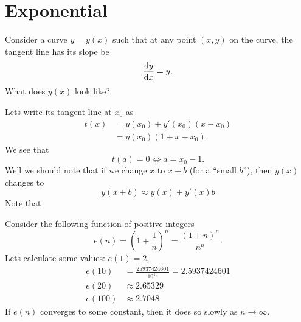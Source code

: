 \section{Exponential}
Consider a curve $y=y(x)$ such that at any point
$(x,y)$ on the curve, the tangent line has its slope be
\begin{equation}
\frac{\mathrm{d} y}{\mathrm{d} x}=y.
\end{equation}
What does $y(x)$ look like?

Lets write its tangent line at $x_{0}$ as
\begin{equation}
\begin{split}
t(x) &= y(x_{0})+y'(x_{0})(x-x_{0})\\
&=y(x_{0})(1+x-x_{0}).
\end{split}
\end{equation}
We see that
\begin{equation}
t(a)=0\iff a=x_{0}-1.
\end{equation}
Well we should note that if we change $x$ to $x+b$ (for a ``small
$b$''), then $y(x)$ changes to
\begin{equation}
y(x+b)\approx y(x)+y'(x)b
\end{equation}
Note that 

\M
Consider the following function of positive integers
\begin{equation}
e(n) = \left(1+\frac{1}{n}\right)^{n}=\frac{(1+n)^{n}}{n^{n}}.
\end{equation}
Lets calculate some values: $e(1)=2$, 
\begin{equation*}
\begin{split}
e(10) &= \frac{25937424601}{10^{10}}=2.5937424601\\
e(20) &\approx 2.65329\\
e(100) &\approx 2.7048
\end{split}
\end{equation*}
If $e(n)$ converges to some constant, then it does so slowly as
$n\to\infty$. 

